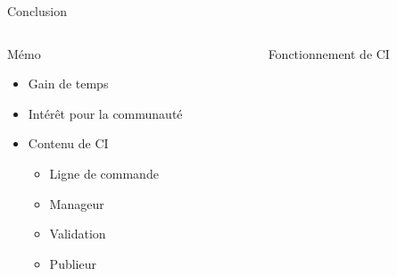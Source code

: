 \documentclass[12pt]{beamer}
\begin{document}
\begin{frame}{Conclusion}
	\begin{columns}[T]
    		\begin{column}{.45\textwidth}
    			\begin{block}{Mémo}
    				\begin{itemize}
    					\item Gain de temps
    					\item Intérêt pour la communauté
    				\end{itemize}
    				\begin{itemize}
    					\item Contenu de CI
    					\begin{itemize}
    						\item Ligne de commande
    						\item Manageur
    						\item Validation
    						\item Publieur
    					\end{itemize}
    				\end{itemize}
    			\end{block}
    		\end{column}
    		\begin{column}{.5\textwidth}
   			\begin{block}{Fonctionnement de CI}
   				\begin{figure}
   				\end{figure}
    			\end{block}
    		\end{column}
  \end{columns}
\end{frame}
\end{document}
